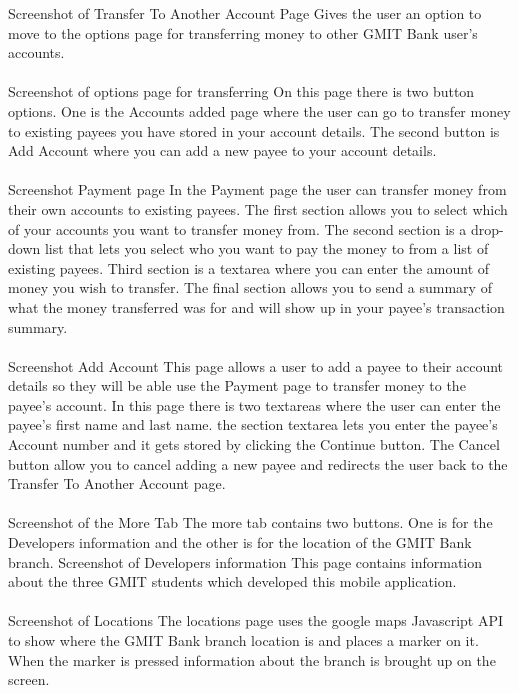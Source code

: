 Screenshot of Transfer To Another Account Page
Gives the user an option to move to the options page for transferring money to other GMIT Bank user’s accounts.\paragraph{}
Screenshot of options page for transferring
On this page there is two button options. One is the Accounts added page where the user can go to transfer money to existing payees you have stored in your account details. The second button is Add Account where you can add a new payee to your account details.\paragraph{}

Screenshot Payment page
In the Payment page the user can transfer money from their own accounts to existing payees. The first section allows you to select which of your accounts you want to transfer money from. The second section is a drop-down list that lets you select who you want to pay the money to from a list of existing payees. Third section is a textarea where you can enter the amount of money you wish to transfer. The final section allows you to send a summary of what the money transferred was for and will show up in your payee’s transaction summary. \paragraph{}
Screenshot Add Account
This page allows a user to add a payee to their account details so they will be able use the Payment page to transfer money to the payee’s account. In this page there is two textareas where the user can enter the payee’s first name and last name. the section textarea lets you enter the payee’s Account number and it gets stored by clicking the Continue button. The Cancel button allow you to cancel adding a new payee and redirects the user back to the Transfer To Another Account page.\paragraph{}
Screenshot of the More Tab
The more tab contains two buttons. One is for the Developers information and the other is for the location of the GMIT Bank branch.
Screenshot of Developers information
This page contains information about the three GMIT students which developed this mobile application.\paragraph{}
Screenshot of Locations
The locations page uses the google maps Javascript API to show where the GMIT Bank branch location is and places a marker on it. When the marker is pressed information about the branch is brought up on the screen.

